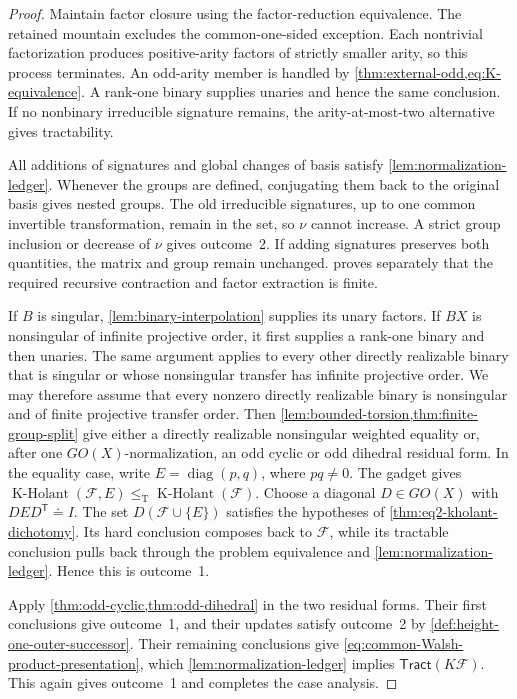\documentclass[11pt,letterpaper,onecolumn]{article}
\theoremstyle{plain}
\theoremstyle{definition}
\theoremstyle{remark}
\newcommand{\cF}{\mathcal F}
\newcommand{\KHolant}{\operatorname{K\text{-}Holant}}
\newcommand{\Tract}{\mathsf{Tract}}
\newcommand{\diag}{\operatorname{diag}}
\newcommand{\leT}{\leq_{\mathrm T}}
\begin{document}
	\begin{proof}
		Maintain factor closure using the factor-reduction equivalence. The
		retained mountain excludes the common-one-sided exception. Each
		nontrivial factorization produces positive-arity factors of strictly smaller
		arity, so this process terminates.  An odd-arity member is handled by
        \cref{thm:external-odd,eq:K-equivalence}. A rank-one binary supplies unaries and hence the same
		conclusion.  If no nonbinary irreducible signature remains, the
		arity-at-most-two alternative gives tractability.
		
		All additions of signatures and global changes of basis satisfy
		\cref{lem:normalization-ledger}.  Whenever the groups are defined, conjugating them
		back to the original basis gives nested groups.  The old irreducible signatures, up to one common
		invertible transformation, remain in the set, so \(\nu\) cannot increase.  A strict
		group inclusion or decrease of \(\nu\) gives outcome~2.  If adding signatures preserves both quantities, the matrix and group
		remain unchanged.
		 proves separately that the required
		recursive contraction and factor extraction is finite.
		
		If \(B\) is singular, \cref{lem:binary-interpolation} supplies its unary
		factors. If \(BX\) is nonsingular of infinite projective
		order, it first supplies a rank-one binary and then unaries.  The same argument applies to every other directly realizable binary that
		is singular or whose nonsingular transfer has infinite projective order.  We may therefore assume
		that every
		nonzero directly realizable binary is nonsingular and of finite projective transfer order.
		Then \cref{lem:bounded-torsion,thm:finite-group-split} give either
		a directly realizable nonsingular weighted equality or, after one
		\(GO(X)\)-normalization, an odd cyclic or odd dihedral residual form.
		In the equality case, write \(E=\diag(p,q)\), where \(pq\ne0\).
		The gadget gives \(\KHolant(\cF,E)\leT\KHolant(\cF)\).
		Choose a diagonal \(D\in GO(X)\) with \(DED^{\mathsf T}\doteq I\).
		The set \(D(\cF\cup\{E\})\) satisfies the hypotheses of
		\cref{thm:eq2-kholant-dichotomy}.  Its hard conclusion composes back to
		\(\cF\), while its tractable conclusion pulls back through the problem
		equivalence and \cref{lem:normalization-ledger}. Hence this is outcome~1.
		
		Apply \cref{thm:odd-cyclic,thm:odd-dihedral} in the two residual forms.
		Their first conclusions give outcome~1, and their updates satisfy
		outcome~2 by \cref{def:height-one-outer-successor}.  Their remaining
		conclusions give \cref{eq:common-Walsh-product-presentation}, which
		\cref{lem:normalization-ledger} implies \(\Tract(K\cF)\).
		This again gives outcome~1 and completes the case analysis.
	\end{proof}
	
\end{document}
